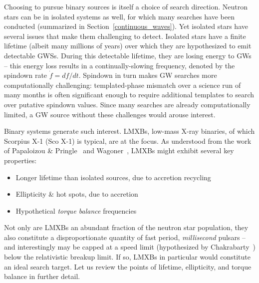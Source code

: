Choosing to pursue binary sources is itself a choice of search direction.
Neutron stars can be in isolated systems as well, for which many searches have been conducted (summarized in Section~\ref{continuous_waves}).
Yet isolated stars have several issues that make them challenging to detect.
Isolated stars have a finite lifetime (albeit many millions of years) over which they are hypothesized to emit detectable GWSs.
During this detectable lifetime, they are losing energy to GWs -- this energy loss results in a continually-slowing frequency, denoted by the spindown rate $\dot{f} = df /dt$.
Spindown in turn makes GW searches more computationally challenging: templated-phase mismatch over a science run of many months is often significant enough to require additional templates to search over putative spindown values. 
Since many searches are already computationally limited, a GW source without these challenges would arouse interest.

Binary systems generate such interest.
LMXBs, low-mass X-ray binaries, of which Scorpius X-1 (Sco X-1) is typical, are at the focus.
As understood from the work of Papaloizou \& Pringle~\cite{PapaloizouPringle1978} and Wagoner~\cite{Wagoner1984}, LMXBs might exhibit several key properties:

\begin{itemize}
\item Longer lifetime than isolated sources, due to accretion recycling
\item Ellipticity \& hot spots, due to accretion
\item Hypothetical \textit{torque balance} frequencies
\end{itemize}

Not only are LMXBs an abundant fraction of the neutron star population, they also constitute a disproportionate quantity of fast period, \textit{millisecond} pulsars -- and interestingly may be capped at a speed limit (hypothesized by Chakrabarty~\cite{Chakrabarty2003}) below the relativistic breakup limit.
If so, LMXBs in particular would constitute an ideal search target.
Let us review the points of lifetime, ellipticity, and torque balance in further detail.



